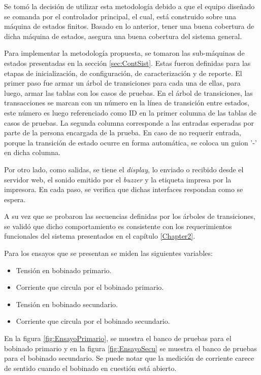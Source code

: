 Se tomó la decisión de utilizar esta metodología debido a que el equipo diseñado se comanda por el controlador principal, el cual, está construido sobre una máquina de estados finitos. Basado en lo anterior, tener una buena cobertura de dicha máquina de estados, asegura una buena cobertura del sistema general.

Para implementar la metodología propuesta, se tomaron las sub-máquinas de estados presentadas en la sección \ref{sec:ContSist}. Estas fueron definidas para las etapas de inicialización, de configuración, de caracterización y de reporte. El primer paso fue armar un árbol de transiciones para cada una de ellas, para luego, armar las tablas con los casos de pruebas. En el árbol de transiciones, las transacciones se marcan con un número en la línea de transición entre estados, este número es luego referenciado como ID en la primer columna de las tablas de casos de pruebas. La segunda columna corresponde a las entradas esperadas por parte de la persona encargada de la prueba. En caso de no requerir entrada, porque la transición de estado ocurre en forma automática, se coloca un guion '-' en dicha columna. 

Por otro lado, como salidas, se tiene el \textit{display}, lo enviado o recibido desde el servidor web, el sonido emitido por el \textit{buzzer} y la etiqueta impresa por la impresora. En cada paso, se verifica que dichas interfaces respondan como se espera.

A su vez que se probaron las secuencias definidas por los árboles de transiciones, se validó que dicho comportamiento es consistente con los requerimientos funcionales del sistema presentados en el capítulo \ref{Chapter2}. 

Para los ensayos que se presentan se miden las siguientes variables:
\begin{itemize}
 	\item Tensión en bobinado primario.
	\item Corriente que circula por el bobinado primario.
	\item Tensión en bobinado secundario.
	\item Corriente que circula por el bobinado secundario.
\end{itemize}

En la figura \ref{fig:EnsayoPrimario}, se muestra el banco de pruebas para el bobinado primario y en la figura \ref{fig:EnsayoSecu} se muestra el banco de pruebas para el bobinado secundario. Se puede notar que la medición de corriente carece de sentido cuando el bobinado en cuestión está abierto.

